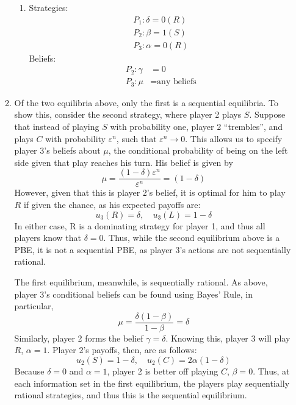 \documentclass[11pt]{article}
\begin{document}
\begin{enumerate}
\begin{enumerate}
\begin{enumerate}[label = \roman*.]
			\item Strategies:
			\begin{gather*}
			P_1: \delta = 0 (R) \\
			P_2: \beta = 1 (S) \\
			P_3: \alpha = 0 (R)
			\end{gather*}
			Beliefs:
			\begin{align*}
			P_2: \gamma &= 0 \\
			P_3: \mu &= \text{any beliefs}
			\end{align*}
		\end{enumerate}
	
		\item Of the two equilibria above, only the first is a sequential equilibria. To show this, consider the second strategy, where player 2 plays $ S $. Suppose that instead of playing $ S $ with probability one, player 2 ``trembles'', and plays $ C $ with probability $ \varepsilon^n $, such that $ \varepsilon^n\to 0 $. This allows us to specify player 3's beliefs about $\mu$, the conditional probability of being on the left side given that play reaches his turn. His belief is given by
		\[\mu = \frac{(1 - \delta)\varepsilon^n}{\varepsilon^n} = (1 - \delta)\]
		However, given that this is player 2's belief, it is optimal for him to play $ R $ if given the chance, as his expected payoffs are:
		\[u_3(R) = \delta,\quad u_3(L) = 1 - \delta \]
		In either case, R is a dominating strategy for player 1, and thus all players know that $\delta = 0$. Thus, while the second equilibrium above is a PBE, it is not a sequential PBE, as player 3's actions are not sequentially rational. 
		
		The first equilibrium, meanwhile, is sequentially rational. As above, player 3's conditional beliefs can be found using Bayes' Rule, in particular,
		\[\mu = \frac{\delta (1 - \beta)}{1 - \beta} = \delta\]
		Similarly, player 2 forms the belief $ \gamma = \delta $. Knowing this, player 3 will play $ R $, $\alpha = 1$. Player 2's payoffs, then, are as follows:
		\[u_2(S) = 1 - \delta, \quad u_2(C) = 2\alpha(1 - \delta)\]
		Because $\delta = 0$ and $\alpha = 1$, player 2 is better off playing $ C $, $\beta = 0$. Thus, at each information set in the first equilibrium, the players play sequentially rational strategies, and thus this is the sequential equilibrium. 
	\end{enumerate}
\end{enumerate}
\end{document}
